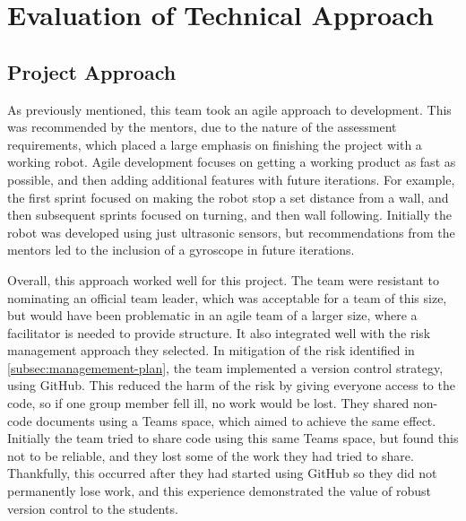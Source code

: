 


\section{Evaluation of Technical Approach}\label{sec:technical}
    \subsection{Project Approach}\label{subsec:technical-project_aproach}
        As previously mentioned, this team took an agile approach to development.
        This was recommended by the mentors, due to the nature of the assessment requirements, which placed a large emphasis on finishing the project with a working robot.
        Agile development focuses on getting a working product as fast as possible, and then adding additional features with future iterations.
        For example, the first sprint focused on making the robot stop a set distance from a wall, and then subsequent sprints focused on turning, and then wall following.
        Initially the robot was developed using just ultrasonic sensors, but recommendations from the mentors led to the inclusion of a gyroscope in future iterations.

        Overall, this approach worked well for this project.
        The team were resistant to nominating an official team leader, which was acceptable for a team of this size, but would have been problematic in an agile team of a larger size, where a facilitator is needed to provide structure.
        It also integrated well with the risk management approach they selected.
        In mitigation of the risk identified in \autoref{subsec:managemement-plan}, the team implemented a version control strategy, using GitHub.
        This reduced the harm of the risk by giving everyone access to the code, so if one group member fell ill, no work would be lost.
        They shared non-code documents using a Teams space, which aimed to achieve the same effect.
        Initially the team tried to share code using this same Teams space, but found this not to be reliable, and they lost some of the work they had tried to share.
        Thankfully, this occurred after they had started using GitHub so they did not permanently lose work, and this experience demonstrated the value of robust version control to the students.

